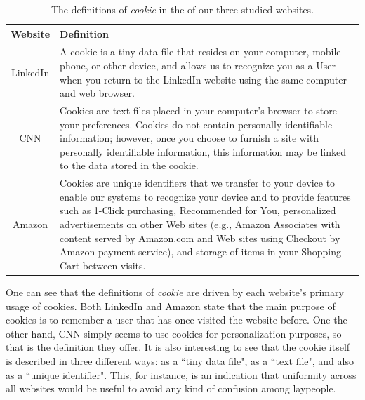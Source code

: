 \documentclass{acm_proc_article-sp}
\begin{document}
\begin{table}[h]
  \centering
  \caption{The definitions of \textit{cookie} in the \pps of our three studied websites.}
    \begin{tabular}{|c|p{6.5cm}|}
    \hline
    \textbf{Website} & \textbf{Definition} \\    
     \hline
     LinkedIn &  A cookie is a tiny data file that resides on your computer, mobile phone, or other device, and allows us to recognize you as a User when you return to the LinkedIn website using the same computer and web browser. \\
     \hline
     CNN & Cookies are text files placed in your computer's browser to store your preferences. Cookies do not contain personally identifiable information; however, once you choose to furnish a site with personally identifiable information, this information may be linked to the data stored in the cookie. \\
\hline
     Amazon & Cookies are unique identifiers that we transfer to your device to enable our systems to recognize your device and to provide features such as 1-Click purchasing, Recommended for You, personalized advertisements on other Web sites (e.g., Amazon Associates with content served by Amazon.com and Web sites using Checkout by Amazon payment service), and storage of items in your Shopping Cart between visits.  \\
     \hline
    \end{tabular}%
  \label{tab:cookie-defs}%
\end{table}%

One can see that the definitions of \textit{cookie} are driven by each website's primary usage of cookies. Both LinkedIn and Amazon state that the main purpose of cookies is to remember a user that has once visited the website before. One the other hand, CNN simply seems to use cookies for personalization purposes, so that is the definition they offer. It is also interesting to see that the cookie itself is described in three different ways: as a ``tiny data file", as a ``text file", and also as a ``unique identifier". This, for instance, is an indication that uniformity across all websites would be useful to avoid any kind of confusion among laypeople. 
\end{document}
